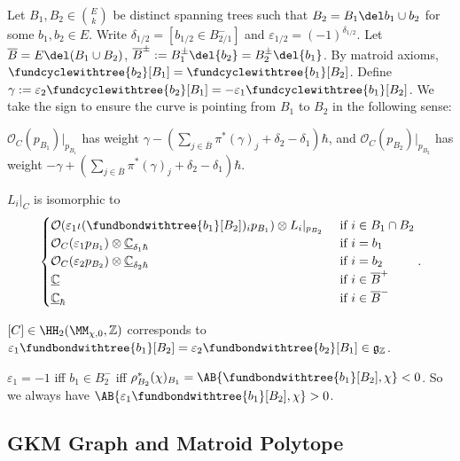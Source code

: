 Let $B_1,B_2\in \binom{E}{k}$ be distinct spanning trees such that $B_2=B_1\del b_1\cup b_2$ for some $b_1,b_2\in E$. 
Write $\delta_{1/2}=\left[b_{1/2}\in B_{2/1}^-\right]$ and $\varepsilon_{1/2}=(-1)^{\delta_{1/2}}$. Let $\overline{B}=E\del (B_1\cup B_2)$, $\overline{B}^{\pm}:=B_1^{\pm}\del\{b_2\}=B_2^{\pm}\del\{b_1\}$.
By matroid axioms, $\fundcyclewithtree{b_2}[B_1]=\fundcyclewithtree{b_1}[B_2]$.
Define $\gamma:=\varepsilon_2\fundcyclewithtree{b_2}[B_1]=-\varepsilon_1\fundcyclewithtree{b_1}[B_2]$.
We take the sign to ensure the curve is pointing from $B_1$ to $B_2$ in the following sense:
\missing{}
\begin{proposition}[pps:]{}
    $\mathcal{O}_C(p_{B_1})|_{p_{B_1}}$ has weight $\gamma-\left(\sum_{j\in \overline{B}}^{}\pi^*(\gamma)_j+\delta_2-\delta_1\right)\hbar$, and $\mathcal{O}_C(p_{B_2})|_{p_{B_2}}$ has weight $-\gamma+\left(\sum_{j\in \overline{B}}^{}\pi^*(\gamma)_j+\delta_2-\delta_1\right)\hbar$.
\end{proposition}

\begin{proposition}[pps:]{}
    $L_i|_{C}$ is isomorphic to
    \[
        \begin{cases}
            \mathcal{O}(\varepsilon_1\iota(\fundbondwithtree{b_1}[B_2])_ip_{B_1})\otimes L_i|_{p_{B_2}} & \textnormal{ if } i\in B_1\cap B_2 \\
            \mathcal{O}_C(\varepsilon_1p_{B_1})\otimes\underline{\mathbb{C}}_{\delta_1\hbar} & \textnormal{ if } i=b_1\\
            \mathcal{O}_C(\varepsilon_2p_{B_2})\otimes\underline{\mathbb{C}}_{\delta_2\hbar} & \textnormal{ if } i=b_2\\
            \underline{\mathbb{C}} & \textnormal{ if } i\in \overline{B}^+\\
            \underline{\mathbb{C}}_\hbar & \textnormal{ if } i\in \overline{B}^-\\
        \end{cases}
        .
    \]
\end{proposition}

\begin{corollary}[crl:]{}
    $[C]\in \HH_2(\MM_{\chi,0},\mathbb{Z})$ corresponds to $\varepsilon_1\fundbondwithtree{b_1}[B_2]=\varepsilon_2\fundbondwithtree{b_2}[B_1]\in \mathfrak{g}_\mathbb{Z}$.
\end{corollary}

\begin{remark}
    $\varepsilon_1=-1$ iff $b_1\in B_2^-$ iff $\rho^*_{B_2}(\chi)_{B_1}=\AB{\fundbondwithtree{b_1}[B_2],\chi}<0$. So we always have $\AB{\varepsilon_1\fundbondwithtree{b_1}[B_2],\chi}>0$.
\end{remark}

\subsection{GKM Graph and Matroid Polytope}
\missing{}

